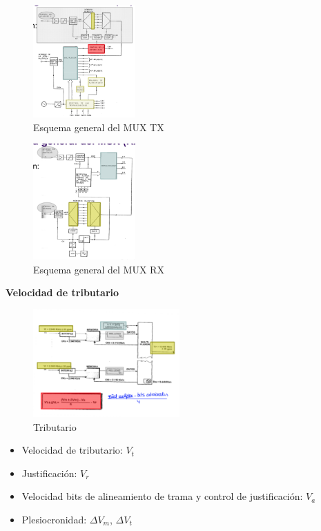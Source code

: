\documentclass[10pt,portrait, twocolumn]{article}
\begin{document}
\begin{figure}[!ht]
	\centering
     \includegraphics[width=0.35\textwidth]{muxtx}
      \caption{Esquema general del MUX TX}
      \label{fig:Regiones de frecuencias}
\end{figure}

\begin{figure}[!ht]
	\centering
     \includegraphics[width=0.35\textwidth]{muxrx}
      \caption{Esquema general del MUX RX}
      \label{fig:Regiones de frecuencias}
\end{figure}

\textbf{Velocidad de tributario}

\begin{figure}[!ht]
	\centering
     \includegraphics[width=0.5\textwidth]{tributario}
      \caption{Tributario}
      \label{fig:Regiones de frecuencias}
\end{figure}

\begin{itemize}
\item Velocidad de tributario: $V_{t}$
\item Justificación: $V_{r}$
\item Velocidad bits de alineamiento de trama y control de justificación: $V_{a}$
\item Plesiocronidad: $\Delta V_{m}$, $\Delta V_{t}$
\end{itemize}
\end{document}
